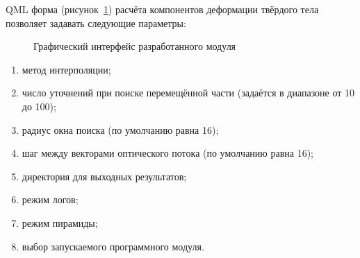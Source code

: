 QML форма (рисунок~\ref{pic:qml_screen}) расчёта компонентов деформации твёрдого тела позволяет задавать следующие параметры:
\begin{figure}[h!]
\caption{Графический интерфейс разработанного модуля}
\label{pic:qml_screen}
\end{figure}
\begin{enumerate}
\item метод интерполяции;
\item число уточнений при поиске перемещённой части (задаётся в диапазоне от 10 до 100);
\item радиус окна поиска (по умолчанию равна 16);
\item шаг между векторами оптического потока (по умолчанию равна 16);
\item директория для выходных результатов;
\item режим логов;
\item режим пирамиды;
\item выбор запускаемого программного модуля.
\end{enumerate}
